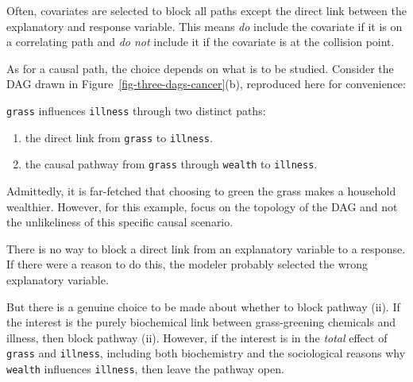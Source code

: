 \documentclass[
  letterpaper,
  DIV=11,
  numbers=noendperiod,
  oneside]{scrartcl}
\providecommand{\tightlist}{%
  \setlength{\itemsep}{0pt}\setlength{\parskip}{0pt}}\usepackage{longtable,booktabs,array}
\begin{document}
Often, covariates are selected to block all paths except the direct link
between the explanatory and response variable. This means \emph{do}
include the covariate if it is on a correlating path and \emph{do not}
include it if the covariate is at the collision point.

As for a causal path, the choice depends on what is to be studied.
Consider the DAG drawn in Figure~\ref{fig-three-dags-cancer}(b),
reproduced here for convenience:


\texttt{grass} influences \texttt{illness} through two distinct paths:

\begin{enumerate}
\def\labelenumi{\roman{enumi}.}
\tightlist
\item
  the direct link from \texttt{grass} to \texttt{illness}.
\item
  the causal pathway from \texttt{grass} through \texttt{wealth} to
  \texttt{illness}.
\end{enumerate}

Admittedly, it is far-fetched that choosing to green the grass makes a
household wealthier. However, for this example, focus on the topology of
the DAG and not the unlikeliness of this specific causal scenario.

There is no way to block a direct link from an explanatory variable to a
response. If there were a reason to do this, the modeler probably
selected the wrong explanatory variable.

But there is a genuine choice to be made about whether to block pathway
(ii). If the interest is the purely biochemical link between
grass-greening chemicals and illness, then block pathway (ii). However,
if the interest is in the \emph{total} effect of \texttt{grass} and
\texttt{illness}, including both biochemistry and the sociological
reasons why \texttt{wealth} influences \texttt{illness}, then leave the
pathway open.
\end{document}
